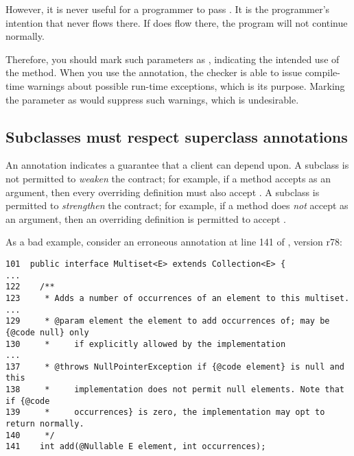 
However, it is never useful for a programmer to pass .  It is
the programmer's intention that  never flows there.  If
 does flow there, the program will not continue normally.

Therefore, you should mark such parameters as
, indicating
the intended use of the method.  When you use the 
annotation, the checker is able to issue compile-time warnings about
possible run-time exceptions, which is its purpose.  Marking the parameter
as  would suppress such warnings, which is undesirable.



\subsection{Subclasses must respect superclass annotations\label{annotations-are-a-contract}}

An annotation indicates a guarantee that a client can depend upon.  A subclass
is not permitted to \emph{weaken} the contract; for example,
if a method accepts  as an argument, then every overriding
definition must also accept .
A subclass is permitted to \emph{strengthen} the contract; for example,
if a method does \emph{not} accept  as an argument, then an
overriding definition is permitted to accept .

As a bad example, consider an erroneous  annotation at
line 141 of , version r78:

\begin{Verbatim}
101  public interface Multiset<E> extends Collection<E> {
...
122    /**
123     * Adds a number of occurrences of an element to this multiset.
...
129     * @param element the element to add occurrences of; may be {@code null} only
130     *     if explicitly allowed by the implementation
...
137     * @throws NullPointerException if {@code element} is null and this
138     *     implementation does not permit null elements. Note that if {@code
139     *     occurrences} is zero, the implementation may opt to return normally.
140     */
141    int add(@Nullable E element, int occurrences);
\end{Verbatim}

